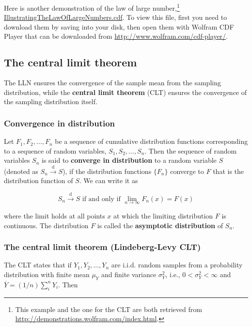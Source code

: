 \documentclass[a4paper,11pt]{article}
\begin{document}
Here is another demonstration of the law of large number,\footnote{This example and the one for the CLT are both retrieved from
\url{http://demonstrations.wolfram.com/index.html}.}
\url{IllustratingTheLawOfLargeNumbers.cdf}. To view this file,
first you need to download them by saving into your disk, then open
them with Wolfram CDF Player that can be downloaded from
\url{http://www.wolfram.com/cdf-player/}.


\subsection{The central limit theorem}
\label{sec:org1653293}

The LLN ensures the convergence of the sample mean from the sampling
distribution, while the \textbf{central limit theorem} (CLT) ensures the
convergence of the sampling distribution itself. 

\subsubsection*{Convergence in distribution}
\label{sec:orgf6665d7}

Let \(F_1, F_2, \ldots, F_n\) be a sequence of cumulative distribution
functions corresponding to a sequence of random variables, \(S_1, S_2,
\ldots, S_n\). Then the sequence of random variables \({S_n}\) is said to
\textbf{converge in distribution} to a random variable \(S\) (denoted as \(S_n
\xrightarrow{\text{d}} S\)), if the distribution functions \(\{F_n\}\)
converge to \(F\) that is the distribution function of \(S\). We can write
it as

\[ S_n \xrightarrow{\text{d}} S \text{ if and only if } \lim_{n
\rightarrow \infty}F_n(x)=F(x) \]

where the limit holds at all points \(x\) at which the limiting
distribution \(F\) is continuous. The distribution \(F\) is called the
\textbf{asymptotic distribution} of \(S_n\).

\subsubsection*{The central limit theorem (Lindeberg-Levy CLT)}
\label{sec:org6b94d47}

The CLT states that if \(Y_1, Y_2, \ldots, Y_n\) are i.i.d. random samples from a
probability distribution with finite mean \(\mu_Y\) and finite variance
\(\sigma^2_Y\), i.e., \(0 < \sigma^2_Y < \infty\) and \(\overline{Y} =
(1/n)\sum_i^nY_i\). Then
\end{document}
